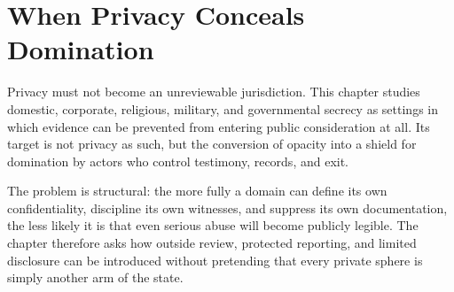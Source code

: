 
\chapter{When Privacy Conceals Domination}
\label{ch:ch092}

Privacy must not become an unreviewable jurisdiction. This chapter studies domestic, corporate, religious, military, and governmental secrecy as settings in which evidence can be prevented from entering public consideration at all. Its target is not privacy as such, but the conversion of opacity into a shield for domination by actors who control testimony, records, and exit.

The problem is structural: the more fully a domain can define its own confidentiality, discipline its own witnesses, and suppress its own documentation, the less likely it is that even serious abuse will become publicly legible. The chapter therefore asks how outside review, protected reporting, and limited disclosure can be introduced without pretending that every private sphere is simply another arm of the state.
